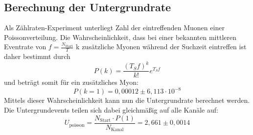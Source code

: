 \subsection{Berechnung der Untergrundrate}
Als Zählraten-Experiment unterliegt Zahl der eintreffenden Muonen einer Poissonverteilung. Die Wahrscheinlichkeit, dass bei einer bekannten mittleren Eventrate von $f=\frac{N_{\mathrm{Start}}}{T}$ k zusätzliche Myonen während der Suchzeit eintreffen ist daher bestimmt durch
\begin{equation}
P(k)=\frac{(T_{S}f)^k}{k!}e^{T_{S}f}
\end{equation}
und beträgt somit für ein zusätzliches Myon:
\begin{equation}
P(k=1)=0,00012\pm6,113\cdot10^{-8}
\end{equation}
Mittels dieser Wahrscheinlichkeit kann nun die Untergrundrate berechnet werden. Die Untergrundevents teilen sich dabei gleichmäßig auf alle Kanäle auf:
\begin{equation}
U_{\mathrm{poisson}}=\frac{N_{\mathrm{Start}}\cdot P(1)}{N_{\mathrm{Kanal}}}=2,661\pm0,0014
\end{equation}
